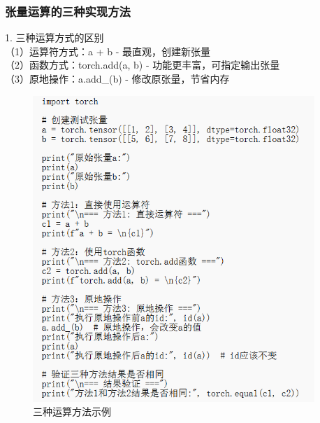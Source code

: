 \documentclass[UTF8]{ctexart}
\begin{document}
\subsubsection{张量运算的三种实现方法}
1. 三种运算方式的区别\\
（1）运算符方式：a + b - 最直观，创建新张量\\
（2）函数方式：torch.add(a, b) - 功能更丰富，可指定输出张量\\
（3）原地操作：a.add_(b) - 修改原张量，节省内存
\begin{figure}[H]
    \centering
    \includegraphics[width=0.95\textwidth]{picture/三种运算方法代码.png}%
    \caption{三种运算方法示例}
\end{figure}
\end{document}

